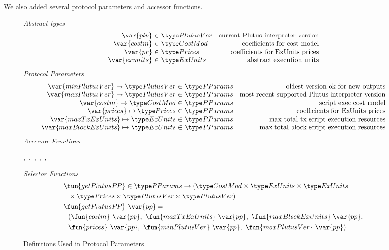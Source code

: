 We also added several protocol parameters and accessor functions.


\begin{figure*}[htb]
  \emph{Abstract types}
  \begin{equation*}
    \begin{array}{r@{~\in~}lr}
      \var{plv} & \PlutusVer & \text{current Plutus interpreter version}\\
      \var{costm} & \CostMod & \text{coefficients for cost model} \\
      \var{pr} & \Prices & \text{coefficients for ExUnits prices} \\
      \var{exunits} & \ExUnits & \text{abstract execution units} \\
    \end{array}
  \end{equation*}
  \emph{Protocol Parameters}
  \begin{equation*}
      \begin{array}{r@{~\in~}lr}
        \var{minPlutusVer} \mapsto \PlutusVer & \PParams & \text{oldest version ok for new outputs}\\
        \var{maxPlutusVer} \mapsto \PlutusVer & \PParams & \text{most recent supported Plutus interpreter version}\\
        \var{costm} \mapsto \CostMod & \PParams & \text{script exec cost model}\\
        \var{prices} \mapsto \Prices & \PParams & \text{coefficients for ExUnits prices} \\
        \var{maxTxExUnits} \mapsto \ExUnits & \PParams & \text{max total tx script execution resources}\\
        \var{maxBlockExUnits} \mapsto \ExUnits & \PParams & \text{max total block script execution resources}\\
      \end{array}
  \end{equation*}
  \emph{Accessor Functions}
  \begin{center}
  ,~,~,~,~,
  ~
  \end{center}
  \emph{Selector Functions}
  \begin{align*}
    & \fun{getPlutusPP} \in \PParams \to (\CostMod \times \ExUnits \times \ExUnits  \\
    & ~~ \times \Prices \times \PlutusVer \times \PlutusVer) \\
    & \fun{getPlutusPP}~\var{pp} = \\
    &~~ (\fun{costm}~\var{pp},~\fun{maxTxExUnits}~\var{pp},~\fun{maxBlockExUnits}~\var{pp}, \\
    &~~\fun{prices}~\var{pp},~\fun{minPlutusVer}~\var{pp},~\fun{maxPlutusVer}~\var{pp})
  \end{align*}
  \caption{Definitions Used in Protocol Parameters}
  \label{fig:defs:protocol-parameters}
\end{figure*}

\clearpage
